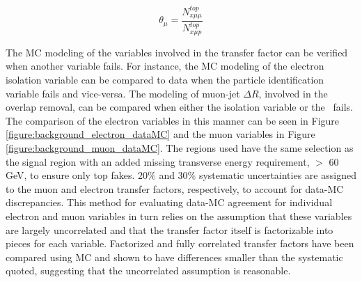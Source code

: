 \begin{equation}
\theta_{\mu} = \frac{N^{top}_{x\mu\mu}}{N^{top}_{x\mu p}}
\label{equation:background_theta_3l_m}
\end{equation}




The MC modeling of the variables involved in the transfer factor can be verified when another variable fails. For instance, the MC modeling of the electron isolation variable can be compared to data when the particle identification variable fails and vice-versa. The modeling of muon-jet $\Delta R$, involved in the overlap removal, can be compared when either the isolation variable or the \pt\ fails. The comparison of the electron variables in this manner can be seen in Figure \ref{figure:background_electron_dataMC} and the muon variables in Figure \ref{figure:background_muon_dataMC}. The regions used have the same selection as the signal region with an added missing transverse energy requirement, $>$ 60 GeV, to ensure only top fakes. 20\% and 30\% systematic uncertainties are assigned to the muon and electron transfer factors, respectively, to account for data-MC discrepancies. This method for evaluating data-MC agreement for individual electron and muon variables in turn relies on the assumption that these variables are largely uncorrelated and that the transfer factor itself is factorizable into pieces for each variable. Factorized and fully correlated transfer factors have been compared using MC and shown to have differences smaller than the systematic quoted, suggesting that the uncorrelated assumption is reasonable. 


